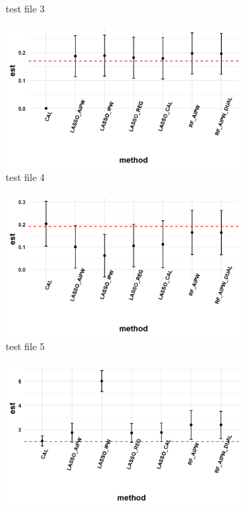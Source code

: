 \documentclass[11pt, oneside]{article}
\begin{document}
\begin{figure}[h]
\begin{subfigure}{0.24\textwidth}
    \caption{test file 3}
  \end{subfigure}
  \begin{subfigure}{0.24\textwidth}
    \includegraphics[width=\textwidth]{../plot/method_comparison_high_4.png}
    \caption{test file 4}
  \end{subfigure}
    \begin{subfigure}{0.24\textwidth}
    \includegraphics[width=\textwidth]{../plot/method_comparison_high_5.png}
    \caption{test file 5}
  \end{subfigure}
  \begin{subfigure}{0.24\textwidth}
    \includegraphics[width=\textwidth]{../plot/method_comparison_high_6.png}

\end{subfigure}
\end{figure}
\end{document}
